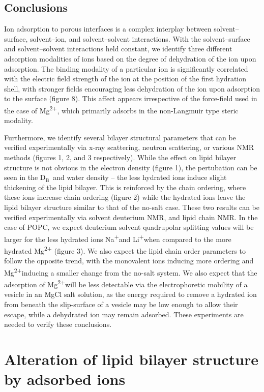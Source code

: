 \documentclass[12pt,openany,final]{book}
\newcommand{\db}{$\text{D}_\text{B}$}
\newcommand{\na}{Na\textsuperscript{+}}
\newcommand{\li}{Li\textsuperscript{+}}
\newcommand{\mg}{Mg\textsuperscript{2+}}
\begin{document}
\section{Conclusions}
Ion adsorption to porous interfaces is a complex interplay 
between solvent--surface, solvent--ion, and solvent--solvent
interactions. With the solvent--surface and solvent--solvent interactions 
held constant, we identify
three different adsorption modalities of ions based on the degree of 
dehydration of the ion upon adsorption. 
The binding modality of a particular ion is significantly correlated 
with the electric field strength of the ion
at the position of the first hydration shell, with stronger fields 
encouraging less dehydration of the ion upon
adsorption to the surface {(figure 8)}. This affect appears irrespective of the force-field 
used in the case
of \mg, which primarily adsorbs in the non-Langmuir type steric modality.


Furthermore, we identify several bilayer structural
parameters that can be verified experimentally via x-ray scattering, neutron
scattering,
or various NMR methods {(figures 1, 2, and 3 respectively).}
While the effect on lipid bilayer structure is not obvious in
the electron density {(figure 1)}, the pertubation can be seen in the \db~and water density --
the less hydrated ions induce slight thickening of the lipid bilayer. This
is reinforced by the chain ordering, where these ions increase chain ordering {(figure 2)} 
while the hydrated ions leave the lipid bilayer structure similar to that of the no-salt case.
These two results can be verified experimentally via solvent deuterium NMR, and lipid chain NMR.
In the case of POPC, we expect deuterium solvent quadrupolar splitting values will be 
{larger} 
for the less hydrated ions \na and \li when compared to the more hydrated Mg\textsuperscript{2+} {(figure 3)}. 
We also expect the lipid chain order parameters to follow the opposite trend,
with the monovalent ions inducing more ordering and \mg inducing a smaller change from the no-salt system.
We also expect that the adsorption of \mg will be less detectable via the 
electrophoretic mobility of a vesicle in an MgCl salt solution, as
the energy required to remove a hydrated ion from 
beneath the slip-surface of a vesicle may be low enough to allow their escape, while a dehydrated ion may remain
adsorbed.
These experiments are needed to verify
these conclusions. 

\chapter[Alteration of bilayer structure by adsorbed ions]{Alteration of lipid bilayer structure by adsorbed ions}
\end{document}
